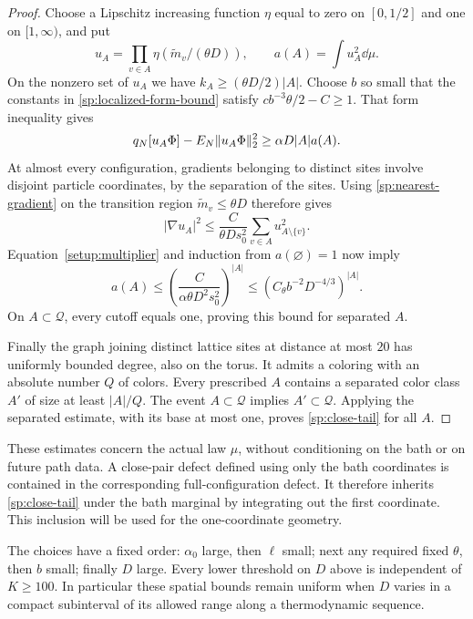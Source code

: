 \begin{proof}
Choose a Lipschitz increasing function $\eta$ equal to zero on
$[0,1/2]$ and one on $[1,\infty)$, and put
\[
 u_A=\prod_{v\in A}\eta(\widetilde m_v/(\theta D)),
 \qquad a(A)=\int u_A^2\dd\mu.
\]
On the nonzero set of $u_A$ we have
$k_A\ge(\theta D/2)|A|$.  Choose $b$ so small that the constants
in \eqref{sp:localized-form-bound} satisfy
$cb^{-3}\theta/2-C\ge1$.  That form inequality gives
\[
 q_N[u_A\Phi]-E_N\lVert u_A\Phi\rVert_2^2
       \ge\alpha D|A|a(A).
\]
At almost every configuration, gradients belonging to distinct sites involve
disjoint particle coordinates, by the separation of the sites.
Using \eqref{sp:nearest-gradient} on the transition region
$\widetilde m_v\le\theta D$ therefore gives
\[
 |\nabla u_A|^2\le\frac{C}{\theta Ds_0^2}
                    \sum_{v\in A}u_{A\setminus\{v\}}^2.
\]
Equation~\eqref{setup:multiplier} and induction from
$a(\varnothing)=1$ now imply
\[
 a(A)\le\left(\frac{C}{\alpha\theta D^2s_0^2}\right)^{|A|}
       \le\left(C_\theta b^{-2}D^{-4/3}\right)^{|A|}.
\]
On $A\subset\mathcal Q$, every cutoff equals one, proving this
bound for separated $A$.

Finally the graph joining distinct lattice sites at distance at most
$20$ has uniformly bounded degree, also on the torus.  It admits a
coloring with an absolute number $Q$ of colors.  Every prescribed
$A$ contains a separated color class $A'$ of size at least $|A|/Q$.
The event $A\subset\mathcal Q$ implies $A'\subset\mathcal Q$.
Applying the separated estimate, with its base at most one, proves
\eqref{sp:close-tail} for all $A$.
\end{proof}

These estimates concern the actual law $\mu$, without conditioning on
the bath or on future path data.  A close-pair defect defined using only
the bath coordinates is contained in the corresponding full-configuration
defect.  It therefore inherits \eqref{sp:close-tail} under the bath
marginal by integrating out the first coordinate.  This inclusion will
be used for the one-coordinate geometry.

The choices have a fixed order: $\alpha_0$ large, then $\ell$ small;
next any required fixed $\theta$, then $b$ small; finally $D$ large.
Every lower threshold on $D$ above is independent of $K\ge100$.
In particular these spatial bounds remain uniform when $D$ varies in
a compact subinterval of its allowed range along a thermodynamic sequence.
